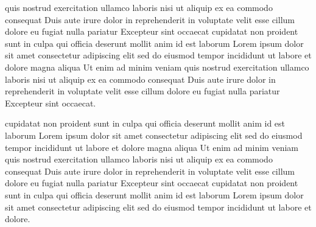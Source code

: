 \documentclass[12pt,a4paper]{article}
\begin{document}
quis nostrud exercitation ullamco laboris nisi ut aliquip ex ea commodo consequat Duis aute irure dolor in reprehenderit in voluptate velit esse cillum dolore eu fugiat nulla pariatur Excepteur sint occaecat cupidatat non proident sunt in culpa qui officia deserunt mollit anim id est laborum Lorem ipsum dolor sit amet consectetur adipiscing elit sed do eiusmod tempor incididunt ut labore et dolore magna aliqua Ut enim ad minim veniam quis nostrud exercitation ullamco laboris nisi ut aliquip ex ea commodo consequat Duis aute irure dolor in reprehenderit in voluptate velit esse cillum dolore eu fugiat nulla pariatur Excepteur sint occaecat.

cupidatat non proident sunt in culpa qui officia deserunt mollit anim id est laborum Lorem ipsum dolor sit amet consectetur adipiscing elit sed do eiusmod tempor incididunt ut labore et dolore magna aliqua Ut enim ad minim veniam quis nostrud exercitation ullamco laboris nisi ut aliquip ex ea commodo consequat Duis aute irure dolor in reprehenderit in voluptate velit esse cillum dolore eu fugiat nulla pariatur Excepteur sint occaecat cupidatat non proident sunt in culpa qui officia deserunt mollit anim id est laborum Lorem ipsum dolor sit amet consectetur adipiscing elit sed do eiusmod tempor incididunt ut labore et dolore.
\end{document}
